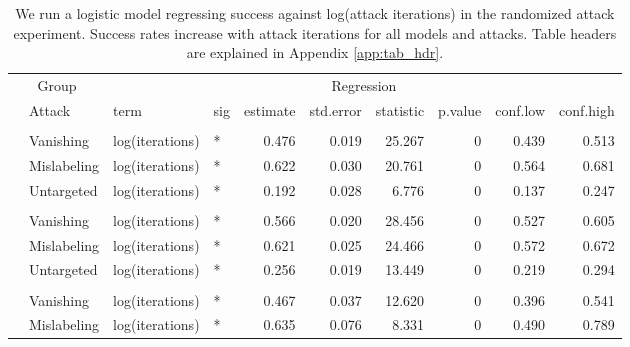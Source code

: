 \begingroup\fontsize{9}{11}\selectfont

\begin{longtable}[t]{llllrrrrrr}
\caption{\label{tab:num_iteration_table}We run a logistic model regressing success against log(attack iterations) in the randomized attack experiment. Success rates increase with attack iterations for all models and attacks. Table headers are explained in Appendix \ref{app:tab_hdr}.}\\
\toprule
\multicolumn{2}{c}{Group} & \multicolumn{8}{c}{Regression} \\
\cmidrule(l{3pt}r{3pt}){1-2} \cmidrule(l{3pt}r{3pt}){3-10}
 & Attack & term & sig & estimate & std.error & statistic & p.value & conf.low & conf.high\\
\midrule
\addlinespace[0.3em]
\multicolumn{10}{l}{\textbf{YOLOv3}}\\
\hspace{1em} & Vanishing & log(iterations) & * & 0.476 & 0.019 & 25.267 & 0 & 0.439 & 0.513\\
\cmidrule{2-10}\nopagebreak
\hspace{1em} & Mislabeling & log(iterations) & * & 0.622 & 0.030 & 20.761 & 0 & 0.564 & 0.681\\
\cmidrule{2-10}\nopagebreak
\hspace{1em} & Untargeted & log(iterations) & * & 0.192 & 0.028 & 6.776 & 0 & 0.137 & 0.247\\
\cmidrule{1-10}\pagebreak[0]
\addlinespace[0.3em]
\multicolumn{10}{l}{\textbf{SSD}}\\
\hspace{1em} & Vanishing & log(iterations) & * & 0.566 & 0.020 & 28.456 & 0 & 0.527 & 0.605\\
\cmidrule{2-10}\nopagebreak
\hspace{1em} & Mislabeling & log(iterations) & * & 0.621 & 0.025 & 24.466 & 0 & 0.572 & 0.672\\
\cmidrule{2-10}\nopagebreak
\hspace{1em} & Untargeted & log(iterations) & * & 0.256 & 0.019 & 13.449 & 0 & 0.219 & 0.294\\
\cmidrule{1-10}\pagebreak[0]
\addlinespace[0.3em]
\multicolumn{10}{l}{\textbf{RetinaNet}}\\
\hspace{1em} & Vanishing & log(iterations) & * & 0.467 & 0.037 & 12.620 & 0 & 0.396 & 0.541\\
\cmidrule{2-10}\nopagebreak
\hspace{1em} & Mislabeling & log(iterations) & * & 0.635 & 0.076 & 8.331 & 0 & 0.490 & 0.789\\

\end{longtable}
